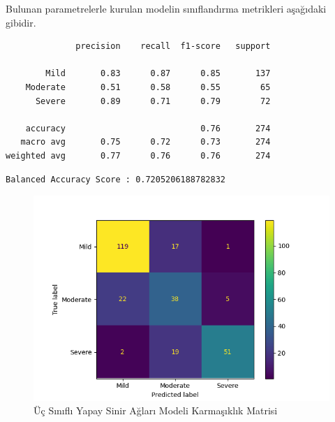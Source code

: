 \documentclass[12pt,twoside]{deuthesis}
\begin{document}
Bulunan parametrelerle kurulan modelin sınıflandırma metrikleri aşağıdaki gibidir.
\begin{verbatim}
              precision    recall  f1-score   support

        Mild       0.83      0.87      0.85       137
    Moderate       0.51      0.58      0.55        65
      Severe       0.89      0.71      0.79        72

    accuracy                           0.76       274
   macro avg       0.75      0.72      0.73       274
weighted avg       0.77      0.76      0.76       274
\end{verbatim}
\begin{verbatim}
Balanced Accuracy Score : 0.7205206188782832
\end{verbatim}
\begin{figure}

{\centering \includegraphics[width=1.05\linewidth,height=0.6\textheight]{figure/nn_conf} 

}

\caption{Üç Sınıflı Yapay Sinir Ağları Modeli Karmaşıklık Matrisi}\label{fig:unnamed-chunk-50}
\end{figure}
\end{document}
